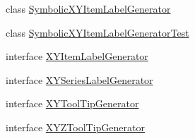 \begin{DoxyCompactItemize}
\item 
class \mbox{\hyperlink{classorg_1_1jfree_1_1chart_1_1labels_1_1_symbolic_x_y_item_label_generator}{Symbolic\+X\+Y\+Item\+Label\+Generator}}
\item 
class \mbox{\hyperlink{classorg_1_1jfree_1_1chart_1_1labels_1_1_symbolic_x_y_item_label_generator_test}{Symbolic\+X\+Y\+Item\+Label\+Generator\+Test}}
\item 
interface \mbox{\hyperlink{interfaceorg_1_1jfree_1_1chart_1_1labels_1_1_x_y_item_label_generator}{X\+Y\+Item\+Label\+Generator}}
\item 
interface \mbox{\hyperlink{interfaceorg_1_1jfree_1_1chart_1_1labels_1_1_x_y_series_label_generator}{X\+Y\+Series\+Label\+Generator}}
\item 
interface \mbox{\hyperlink{interfaceorg_1_1jfree_1_1chart_1_1labels_1_1_x_y_tool_tip_generator}{X\+Y\+Tool\+Tip\+Generator}}
\item 
interface \mbox{\hyperlink{interfaceorg_1_1jfree_1_1chart_1_1labels_1_1_x_y_z_tool_tip_generator}{X\+Y\+Z\+Tool\+Tip\+Generator}}
\end{DoxyCompactItemize}
